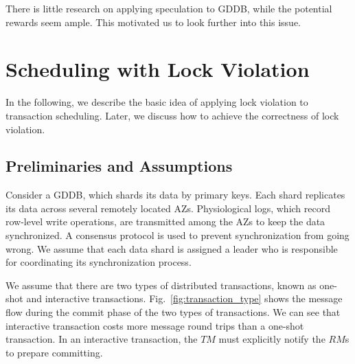 \documentclass[conference]{IEEEtran}
\begin{document}
There is little research on applying speculation to GDDB, while the potential rewards seem ample. This motivated us to look further into this issue.


\section{Scheduling with Lock Violation}
\label{sec:non_strict}

In the following, we describe the basic idea of applying lock violation to transaction scheduling.
Later, we discuss how to achieve the correctness of lock violation.

\subsection{Preliminaries and Assumptions}
Consider a GDDB, which shards its data by primary keys.
Each shard replicates its data across several remotely located AZs.
Physiological logs, which record row-level write operations, are transmitted among the AZs to keep the data synchronized.
A consensus protocol is used to prevent synchronization from going wrong.
We assume that each data shard is assigned a leader who is responsible for coordinating its synchronization process.

We assume that there are two types of distributed transactions, known as one-shot and interactive transactions.
Fig.~\ref{fig:transaction_type} shows the message flow during the commit phase of the two types of transactions.
We can see that interactive transaction costs more message round trips than a one-shot transaction.
In an interactive transaction, the $TM$ must explicitly notify the $RM$s to prepare committing.
\end{document}
